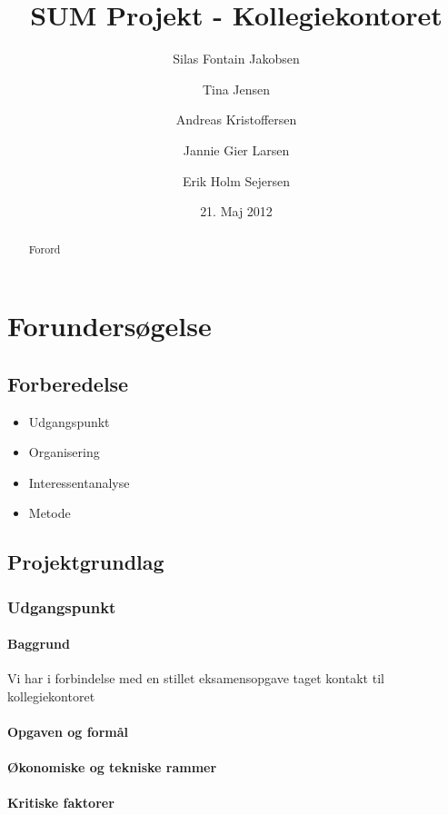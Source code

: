 \documentclass[12pt, a4paper]{report}
\title{SUM Projekt - Kollegiekontoret}
\author{Silas Fontain Jakobsen \and Tina Jensen \and Andreas Kristoffersen \and Jannie Gier Larsen \and Erik Holm Sejersen}
\date{21. Maj 2012}
\begin{document}
\begin{titlepage}
\maketitle
\end{titlepage}

\begin{abstract}
Forord
\end{abstract}

\tableofcontents

\chapter*{Forundersøgelse}

\section*{Forberedelse}
 \begin{itemize}
   \item Udgangspunkt
   \item Organisering
   \item Interessentanalyse
   \item Metode
 \end{itemize}

\section*{Projektgrundlag}
\subsection{Udgangspunkt}
\subsubsection{Baggrund}
Vi har i forbindelse med en stillet eksamensopgave taget kontakt til kollegiekontoret
\subsubsection{Opgaven og formål}
\subsubsection{Økonomiske og tekniske rammer}
\subsubsection{Kritiske faktorer}
\end{document}
